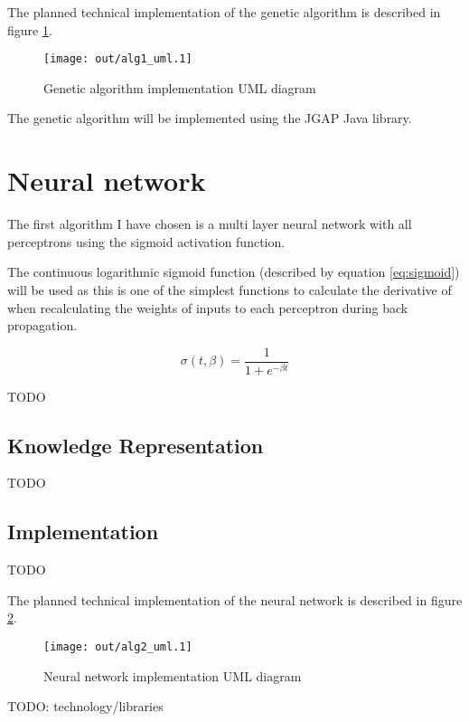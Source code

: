 \documentclass[a4paper]{article}
\begin{document}
The planned technical implementation of the genetic algorithm is described in
figure \ref{fig:alg1_uml}.

\begin{figure}[h!]
  \centering
  \texttt{[image: out/alg1\_uml.1]}
  \caption{Genetic algorithm implementation UML diagram}
  \label{fig:alg1_uml}
\end{figure}

The genetic algorithm will be implemented using the JGAP \cite{ecj} Java
library.

\section{Neural network}

The first algorithm I have chosen is a multi layer neural network with all
perceptrons using the sigmoid activation function.

The continuous logarithmic sigmoid function (described by equation
\ref{eq:sigmoid}) will be used as this is one of the simplest functions to
calculate the derivative of when recalculating the weights of inputs to each
perceptron during back propagation.

\begin{equation}
  \sigma(t, \beta) = \frac{1}{1 + e^{- \beta t}}
  \label{eq:sigmoid}
\end{equation}

TODO

\subsection{Knowledge Representation}

TODO

\subsection{Implementation}

TODO

The planned technical implementation of the neural network is described in
figure \ref{fig:alg2_uml}.

\begin{figure}[h!]
  \centering
  \texttt{[image: out/alg2\_uml.1]}
  \caption{Neural network implementation UML diagram}
  \label{fig:alg2_uml}
\end{figure}

TODO: technology/libraries

\printbibliography
\end{document}
